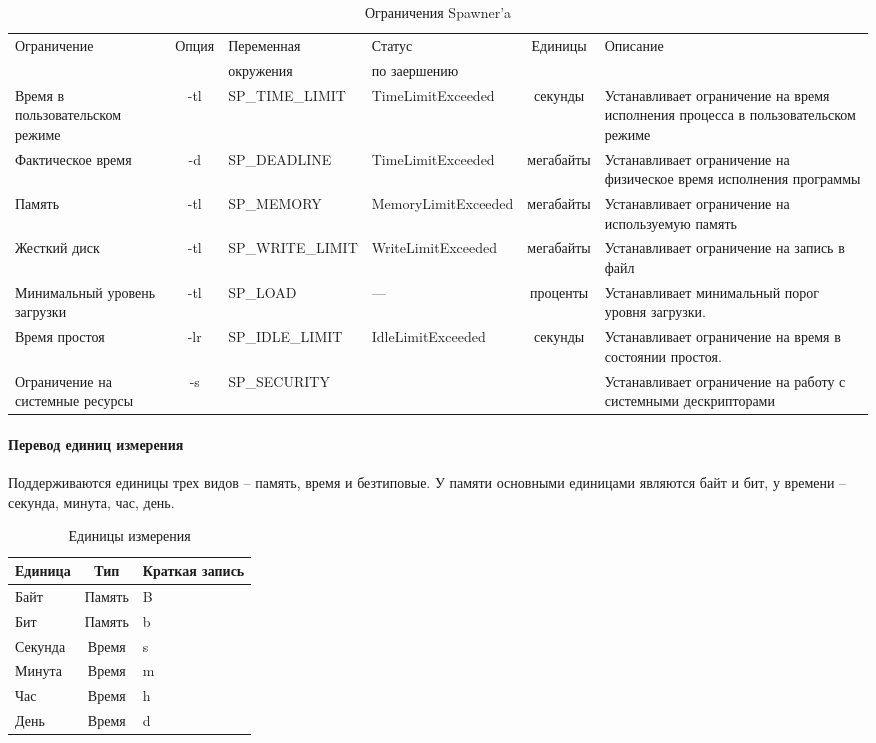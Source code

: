\documentclass{imcs}
\begin{document}
\begin{landscape}
\begin{table}[h!]
\begin{center}
\begin{tabularx}{25cm}{|X|c|X|X|c|X|}
\hline
  Ограничение & Опция  &  Переменная  &  Статус & Единицы & Описание\\
   & & окружения  &  по заершению &  & \\
\hline
  Время в пользовательском режиме & -tl & SP\_TIME\_LIMIT & TimeLimitExceeded & секунды & Устанавливает ограничение на время исполнения процесса в пользовательском режиме\\
\hline
  Фактическое время & -d & SP\_DEADLINE & TimeLimitExceeded & мегабайты & Устанавливает ограничение на физическое время исполнения программы\\
\hline
  Память & -tl & SP\_MEMORY  & MemoryLimitExceeded & мегабайты & Устанавливает ограничение на используемую память\\
\hline
  Жесткий диск & -tl & SP\_WRITE\_LIMIT & WriteLimitExceeded & мегабайты & Устанавливает ограничение на запись в файл\\
\hline
  Минимальный уровень загрузки & -tl & SP\_LOAD & --- & проценты & Устанавливает минимальный порог уровня загрузки.\\
\hline
  Время простоя & -lr & SP\_IDLE\_LIMIT & IdleLimitExceeded & секунды & Устанавливает ограничение на время в состоянии простоя.\\
\hline
  Ограничение на системные ресурсы & -s & SP\_SECURITY & & & Устанавливает ограничение на работу с системными дескрипторами \\
\hline
\end{tabularx}
\caption{Ограничения Spawner'a}\label{tab:sp_rest}
\end{center}
\end{table}
\end{landscape}


\paragraph{Перевод единиц измерения}
Поддерживаются единицы трех видов – память, время и безтиповые. У памяти основными единицами являются байт и бит, у времени – секунда, минута, час, день.

\begin{table}[h!]
\begin{center}
\begin{tabular}{|l|c|l|}
\hline
Единица & Тип & Краткая запись\\
\hline
Байт & Память & B\\
\hline
Бит & Память & b\\
\hline
Секунда & Время &s\\
\hline
Минута  & Время &  m\\
\hline
Час & Время  & h\\
\hline
День &  Время & d\\
\hline
\end{tabular}
\caption{Единицы измерения}\label{tab:sp_units}
\end{center}
\end{table}
\end{document}
